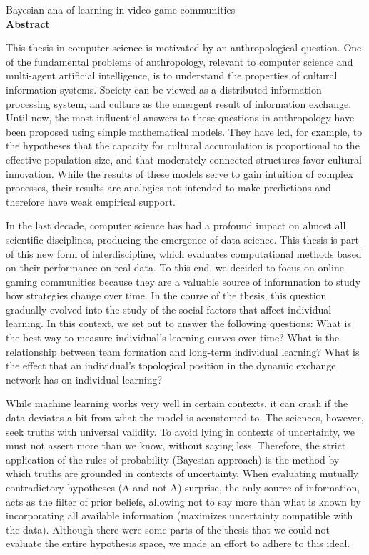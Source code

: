 \documentclass[a4paper,11pt]{book}
\theoremstyle{definition}
\newcommand{\TITULOen}[0]{Bayesian ana of learning in video game communities}
\begin{document}
\newpage


\begin{center}
\Large \TITULOen \normalsize \\[0.5cm]

\textbf{Abstract}
\end{center}


This thesis in computer science is motivated by an anthropological question.
One of the fundamental problems of anthropology, relevant to computer science and multi-agent artificial intelligence, is to understand the properties of cultural information systems.
Society can be viewed as a distributed information processing system, and culture as the emergent result of information exchange.
Until now, the most influential answers to these questions in anthropology have been proposed using simple mathematical models.
They have led, for example, to the hypotheses that the capacity for cultural accumulation is proportional to the effective population size, and that moderately connected structures favor cultural innovation.
While the results of these models serve to gain intuition of complex processes, their results are analogies not intended to make predictions and therefore have weak empirical support.


In the last decade, computer science has had a profound impact on almost all scientific disciplines, producing the emergence of data science.
This thesis is part of this new form of interdiscipline, which evaluates computational methods based on their performance on real data.
To this end, we decided to focus on online gaming communities because they are a valuable source of informnation to study how strategies change over time.
In the course of the thesis, this question gradually evolved into the study of the social factors that affect individual learning.
In this context, we set out to answer the following questions:
What is the best way to measure individual's learning curves over time?
What is the relationship between team formation and long-term individual learning?
What is the effect that an individual's topological position in the dynamic exchange network has on individual learning?


While machine learning works very well in certain contexts, it can crash if the data deviates a bit from what the model is accustomed to.
The sciences, however, seek truths with universal validity.
To avoid lying in contexts of uncertainty, we must not assert more than we know, without saying less.
Therefore, the strict application of the rules of probability (Bayesian approach) is the method by which truths are grounded in contexts of uncertainty.
When evaluating mutually contradictory hypotheses (A and not A) surprise, the only source of information, acts as the filter of prior beliefs, allowing not to say more than what is known by incorporating all available information (maximizes uncertainty compatible with the data).
Although there were some parts of the thesis that we could not evaluate the entire hypothesis space, we made an effort to adhere to this ideal.
\end{document}
